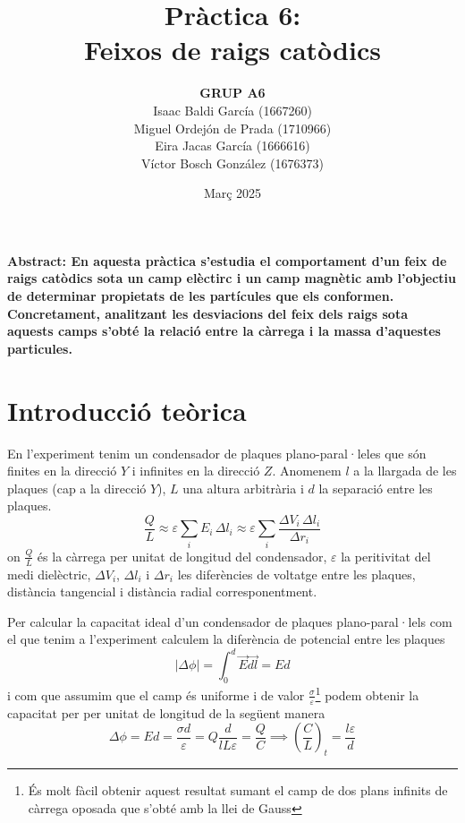 \documentclass[11pt]{article}
\title{\Huge\bfseries Pràctica 6: \\ Feixos de raigs catòdics \\ [2ex] \Large}
\author{\begin{tabular}{c}
\textbf{GRUP A6} \\
Isaac Baldi García (1667260)\\
Miguel Ordejón de Prada (1710966) \\
Eira Jacas García (1666616) \\
Víctor Bosch González (1676373)
\end{tabular}}
\date{Març 2025}
\begin{document}
\maketitle
\begin{center}
    \textbf{Abstract: En aquesta pràctica s'estudia el comportament d'un feix de raigs catòdics sota un camp elèctirc i un camp magnètic amb l'objectiu de determinar propietats de les partícules que els conformen. Concretament, analitzant les desviacions del feix dels raigs sota aquests camps s'obté la relació entre la càrrega i la massa d'aquestes particules.} 
\end{center}


\newpage

\tableofcontents
\newpage

\section{Introducció teòrica}\label{sec: intro}

En l'experiment tenim un condensador de plaques plano-paral·leles que són finites en la direcció $Y$ i infinites en la direcció $Z$. Anomenem $l$ a la llargada de les plaques (cap a la direcció $Y$), $L$ una altura arbitrària i $d$ la separació entre les plaques.
\begin{equation}
    \frac{Q}{L} \approx \varepsilon \sum_i E_i \, \Delta l_i \approx \varepsilon \sum_i \frac{\Delta V_i \, \Delta l_i}{\Delta r_i}
    \label{eq: Q}
\end{equation}
on $\frac{Q }{L }$ és la càrrega per unitat de longitud del condensador, $\varepsilon$ la peritivitat del medi dielèctric, $\Delta V_i$, $\Delta l_i$ i $\Delta r_i$ les diferències de voltatge entre les plaques, distància tangencial i distància radial corresponentment.

Per calcular la capacitat ideal d'un condensador de plaques plano-paral·lels com el que tenim a l'experiment calculem la diferència de potencial entre les plaques 
\begin{equation}
    |\Delta\phi|=\int_{0}^{d} \vec{E}\vec{dl}= Ed
\end{equation}
i com que assumim que el camp és uniforme i de valor $\frac{\sigma}{\varepsilon}$\footnote{És molt fàcil obtenir aquest resultat sumant el camp de dos plans infinits de càrrega oposada que s'obté amb la llei de Gauss} podem obtenir la capacitat per per unitat de longitud de la següent manera
\begin{equation}
    \Delta\phi=Ed=\frac{\sigma d}{\varepsilon}
    =Q\frac{d}{lL\varepsilon}=\frac{Q}{C}\implies (\frac{C}{L})_t=\frac{l\varepsilon}{d}
    \label{eq: c_t}
\end{equation}
\end{document}
